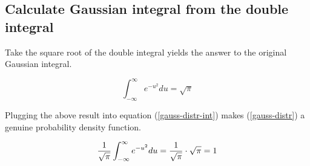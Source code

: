 \subsection{Calculate Gaussian integral from the double integral}

Take the square root of the double integral yields the answer to the original
Gaussian integral.

$$\int_{-\infty}^\infty e^{-u^2}du=\sqrt\pi$$

Plugging the above result into equation (\ref{gauss-distr-int}) makes
(\ref{gauss-distr}) a genuine probability density function.

$$
{1\over\sqrt\pi}\int_{-\infty}^\infty e^{-u^2}du
={1\over\sqrt\pi}\cdot\sqrt\pi=1
$$
